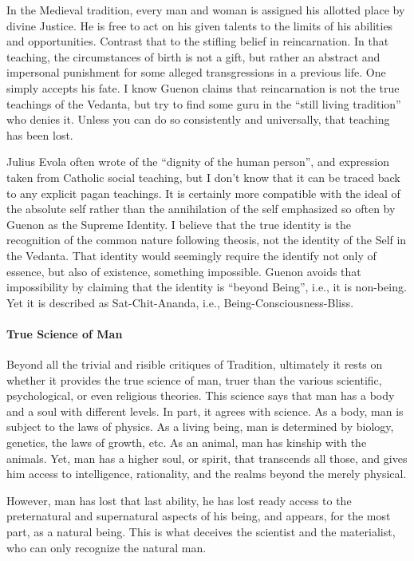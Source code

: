 In the Medieval tradition, every man and woman is assigned his allotted place by divine Justice. He is free to act on his given talents to the limits of his abilities and opportunities. Contrast that to the stifling belief in reincarnation. In that teaching, the circumstances of birth is not a gift, but rather an abstract and impersonal punishment for some alleged transgressions in a previous life. One simply accepts his fate. I know Guenon claims that reincarnation is not the true teachings of the Vedanta, but try to find some guru in the ``still living tradition'' who denies it. Unless you can do so consistently and universally, that teaching has been lost.

Julius Evola often wrote of the ``dignity of the human person'', and expression taken from Catholic social teaching, but I don't know that it can be traced back to any explicit pagan teachings. It is certainly more compatible with the ideal of the absolute self rather than the annihilation of the self emphasized so often by Guenon as the Supreme Identity. I believe that the true identity is the recognition of the common nature following theosis, not the identity of the Self in the Vedanta. That identity would seemingly require the identify not only of essence, but also of existence, something impossible. Guenon avoids that impossibility by claiming that the identity is ``beyond Being'', i.e., it is non-being. Yet it is described as Sat-Chit-Ananda, i.e., Being-Consciousness-Bliss.

\paragraph{True Science of Man}


Beyond all the trivial and risible critiques of Tradition, ultimately it rests on whether it provides the true science of man, truer than the various scientific, psychological, or even religious theories. This science says that man has a body and a soul with different levels. In part, it agrees with science. As a body, man is subject to the laws of physics. As a living being, man is determined by biology, genetics, the laws of growth, etc. As an animal, man has kinship with the animals. Yet, man has a higher soul, or spirit, that transcends all those, and gives him access to intelligence, rationality, and the realms beyond the merely physical.

However, man has lost that last ability, he has lost ready access to the preternatural and supernatural aspects of his being, and appears, for the most part, as a natural being. This is what deceives the scientist and the materialist, who can only recognize the natural man.

